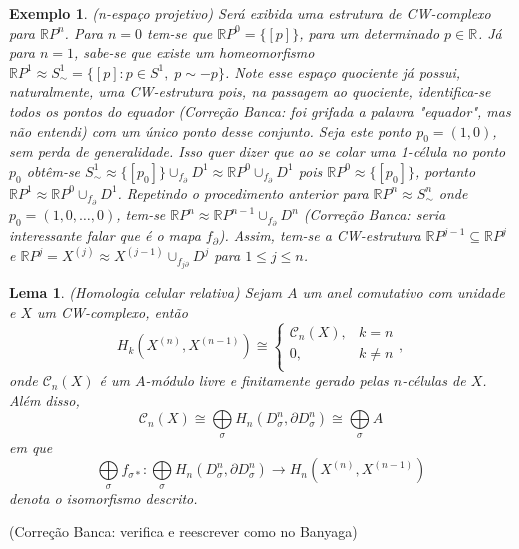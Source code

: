 \documentclass[12pt]{book}
\newtheorem{lema}[teorema]{Lema}
\newtheorem{exemplo}[teorema]{Exemplo}
\newcommand{\classe}[1]{[#1]}
\newcommand{\homologiarelcel}[3]{H_{#1}(D^{#2}_{#3}, \partial D^{#2}_{#3})}
\newcommand{\homologiarelskelesimpl}[2]{H_{#1}(X^{(#2)}, X^{(#2-1)})}
\newcommand{\real}[1]{\mathbb{R}^{#1}}
\newcommand{\realprojetivo}[1]{\mathbb{R}P^{#1}}
\newcommand{\somadir}[1]{\bigoplus \limits_{#1}}
\newcommand{\skeleton}[1]{X^{(#1)}}
\newcommand{\alerta}[1]{{\color{red}#1}}
\newcommand{\correcaobanca}[1]{\alerta{(Correção Banca: #1)}}
\begin{document}
	\begin{exemplo}
		(n-espaço projetivo) Será exibida uma estrutura de CW-complexo para $\realprojetivo{n}$. Para $n=0$ tem-se que $\realprojetivo{0} = \{\classe{p}\}$, para um determinado $p \in \real{}$. Já para $n=1$, sabe-se que existe um homeomorfismo $\realprojetivo{1} \approx S^{1}_{\sim} = \{\classe{p}: p \in S^{1},\; p \sim -p\}$. Note esse espaço quociente já possui, naturalmente, uma CW-estrutura pois, na passagem ao quociente, identifica-se todos os pontos do equador \correcaobanca{foi grifada a palavra "equador", mas não entendi} com um único ponto desse conjunto. Seja este ponto $p_{0} = (1,0)$, sem perda de generalidade. Isso quer dizer que ao se colar uma 1-célula no ponto $p_{0}$ obtêm-se $S^{1}_{\sim} \approx \{[p_{0}]\} \cup_{f_{\partial}}D^{1} \approx \realprojetivo{0}\cup_{f_{\partial}}D^{1} $ pois $\realprojetivo{0} \approx \{[p_{0}]\}$, portanto $ \realprojetivo{1} \approx \realprojetivo{0}\cup_{f_{\partial}}D^{1}$. Repetindo o procedimento anterior para $\realprojetivo{n} \approx S^{n}_{\sim} $ onde $p_{0} = (1,0,\dots, 0)$, tem-se $\realprojetivo{n} \approx \realprojetivo{n-1} \cup_{f_{\partial}}D^{n}$ \correcaobanca{seria interessante falar que é o mapa $f_{\partial}$}. Assim, tem-se a CW-estrutura $\realprojetivo{j-1} \subseteq \realprojetivo{j}$ e $\realprojetivo{j} = \skeleton{j} \approx \skeleton{j-1}\cup_{f_{j\partial}}D^{j}$ para $1\leq j \leq n$.
	\end{exemplo}
	
	\begin{lema}\label{homologiacelular}
		(Homologia celular relativa) Sejam $A$ um anel comutativo com unidade e $X$ um CW-complexo, então
		$$
		\homologiarelskelesimpl{k}{n} \cong 
		\left\{
		\begin{array}{cc}
		\mathcal{C}_{n}(X), & k = n\\
		0, & k\neq n\\
		\end{array}
		\right.,
		$$
		onde $\mathcal{C}_{n}(X)$ é um $A$-módulo livre e finitamente gerado pelas $n$-células de $X$. Além disso,
		$$
		\mathcal{C}_{n}(X) \cong \somadir{\sigma} \homologiarelcel{n}{n}{\sigma} \cong \somadir{\sigma} A
		$$
		em que 
		$$
		\somadir{\sigma}f_{\sigma*}: \somadir{\sigma} \homologiarelcel{n}{n}{\sigma} \to \homologiarelskelesimpl{n}{n}
		$$
		denota o isomorfismo descrito.
	\end{lema}
	\correcaobanca{verifica e reescrever como no Banyaga}
	
\end{document}
